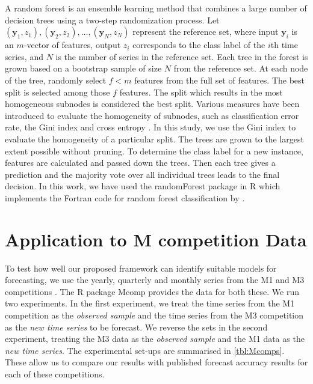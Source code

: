 \documentclass[11pt,a4paper,]{article}
\theoremstyle{definition}
\theoremstyle{definition}
\theoremstyle{definition}
\theoremstyle{remark}
\begin{document}
A random forest \autocite{breiman2001random} is an ensemble learning
method that combines a large number of decision trees using a two-step
randomization process. Let
\((\bm{y}_1, z_1), (\bm{y}_2, z_2), \dots, (\bm{y}_N, z_N)\) represent
the reference set, where input \(\bm{y}_i\) is an \(m\)-vector of
features, output \(z_i\) corresponds to the class label of the \(i\)th
time series, and \(N\) is the number of series in the reference set.
Each tree in the forest is grown based on a bootstrap sample of size
\(N\) from the reference set. At each node of the tree, randomly select
\(f<m\) features from the full set of features. The best split is
selected among those \(f\) features. The split which results in the most
homogeneous subnodes is considered the best split. Various measures have
been introduced to evaluate the homogeneity of subnodes, such as
classification error rate, the Gini index and cross entropy
\autocite{friedman2001elements}. In this study, we use the Gini index to
evaluate the homogeneity of a particular split. The trees are grown to
the largest extent possible without pruning. To determine the class
label for a new instance, features are calculated and passed down the
trees. Then each tree gives a prediction and the majority vote over all
individual trees leads to the final decision. In this work, we have used
the randomForest package \autocites{liaw2002randomforest}{rfpkg} in R
\autocite{Rcore} which implements the Fortran code for random forest
classification by \textcite{breiman2004random}.

\hypertarget{Mcomp}{%
\section{Application to M competition Data}\label{Mcomp}}

To test how well our proposed framework can identify suitable models for
forecasting, we use the yearly, quarterly and monthly series from the M1
\autocite{makridakis1982accuracy} and M3 competitions
\autocite{makridakis2000m3}. The R package Mcomp \autocite{hyndmanmcomp}
provides the data for both these. We run two experiments. In the first
experiment, we treat the time series from the M1 competition as the
\emph{observed sample} and the time series from the M3 competition as
the \emph{new time series} to be forecast. We reverse the sets in the
second experiment, treating the M3 data as the \emph{observed sample}
and the M1 data as the \emph{new time series}. The experimental set-ups
are summarised in \autoref{tbl:Mcomps}. These allow us to compare our
results with published forecast accuracy results for each of these
competitions.
\end{document}
